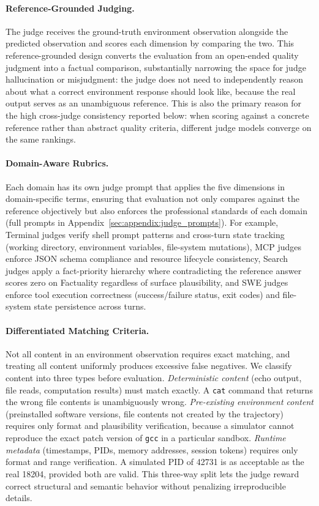 \documentclass{llmxive}
\begin{document}
\paragraph{Reference-Grounded Judging.}
The judge receives the ground-truth environment observation alongside the predicted observation and scores each dimension by comparing the two.
This reference-grounded design converts the evaluation from an open-ended quality judgment into a factual comparison, substantially narrowing the space for judge hallucination or misjudgment: the judge does not need to independently reason about what a correct environment response should look like, because the real output serves as an unambiguous reference.
This is also the primary reason for the high cross-judge consistency reported below: when scoring against a concrete reference rather than abstract quality criteria, different judge models converge on the same rankings.

\paragraph{Domain-Aware Rubrics.}
Each domain has its own judge prompt that applies the five dimensions in domain-specific terms, ensuring that evaluation not only compares against the reference objectively but also enforces the professional standards of each domain (full prompts in Appendix~\ref{sec:appendix:judge_prompts}).
For example, Terminal judges verify shell prompt patterns and cross-turn state tracking (working directory, environment variables, file-system mutations), MCP judges enforce JSON schema compliance and resource lifecycle consistency, Search judges apply a fact-priority hierarchy where contradicting the reference answer scores zero on Factuality regardless of surface plausibility, and SWE judges enforce tool execution correctness (success/failure status, exit codes) and file-system state persistence across turns.

\paragraph{Differentiated Matching Criteria.}
Not all content in an environment observation requires exact matching, and treating all content uniformly produces excessive false negatives.
We classify content into three types before evaluation.
\emph{Deterministic content} (echo output, file reads, computation results) must match exactly. A \texttt{cat} command that returns the wrong file contents is unambiguously wrong.
\emph{Pre-existing environment content} (preinstalled software versions, file contents not created by the trajectory) requires only format and plausibility verification, because a simulator cannot reproduce the exact patch version of \texttt{gcc} in a particular sandbox.
\emph{Runtime metadata} (timestamps, PIDs, memory addresses, session tokens) requires only format and range verification. A simulated PID of 42731 is as acceptable as the real 18204, provided both are valid.
This three-way split lets the judge reward correct structural and semantic behavior without penalizing irreproducible details.
\end{document}
